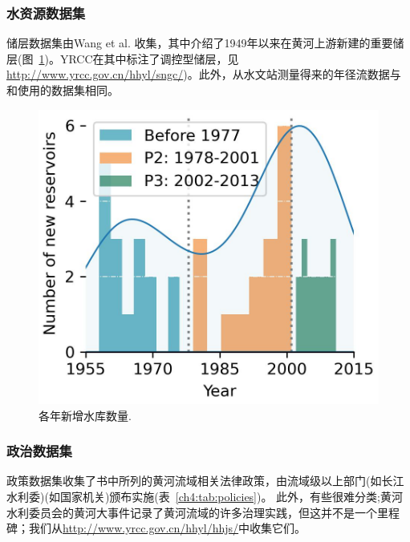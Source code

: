 \subsubsection{水资源数据集}
储层数据集由Wang et al. \cite{wang2019c}收集，其中介绍了1949年以来在黄河上游新建的重要储层(图~\ref{fig:reservoirs})。YRCC在其中标注了调控型储层，见\url{http://www.yrcc.gov.cn/hhyl/sngc/})。此外，从水文站测量得来的年径流数据与\cite{wang2019c}和\cite{wang2016e}使用的数据集相同。

\begin{figure}[tb]
    \centering
    \includegraphics[width=0.6\linewidth]{img/ch4/reservoirs.jpg}
    \caption{
        各年新增水库数量.
    }
    \label{fig:reservoirs}
\end{figure}

\subsubsection{政治数据集}

政策数据集收集了\cite{shuilibuhuangheshuiliweiyuanhui}书中所列的黄河流域相关法律政策，由流域级以上部门(如长江水利委)(如国家机关)颁布实施(表~\ref{ch4:tab:policies})。
此外，有些很难分类;黄河水利委员会的黄河大事件记录了黄河流域的许多治理实践，但这并不是一个里程碑；我们从\url{http://www.yrcc.gov.cn/hhyl/hhjs/}中收集它们。


